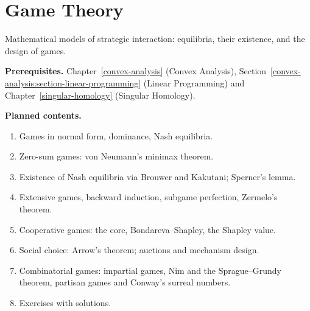 \chapter{Game Theory}\label{game-theory}

Mathematical models of strategic interaction: equilibria, their existence, and the design of games.

\noindent\textbf{Prerequisites.} Chapter~\ref{convex-analysis} (Convex Analysis), Section~\ref{convex-analysis:section-linear-programming} (Linear Programming) and Chapter~\ref{singular-homology} (Singular Homology).

\noindent\textbf{Planned contents.}
\begin{enumerate}
\item Games in normal form, dominance, Nash equilibria.
\item Zero-sum games: von Neumann's minimax theorem.
\item Existence of Nash equilibria via Brouwer and Kakutani; Sperner's lemma.
\item Extensive games, backward induction, subgame perfection, Zermelo's theorem.
\item Cooperative games: the core, Bondareva--Shapley, the Shapley value.
\item Social choice: Arrow's theorem; auctions and mechanism design.
\item Combinatorial games: impartial games, Nim and the Sprague--Grundy theorem, partisan games and Conway's surreal numbers.
\item Exercises with solutions.
\end{enumerate}
